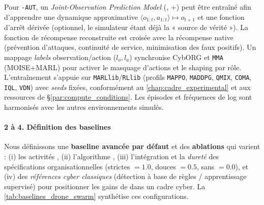 Pour \texttt{-AUT}, un \textit{Joint-Observation Prediction Model} (, +) peut être entraîné afin d’apprendre une dynamique approximative $\langle o_{1:t}, a_{1:t} \rangle \mapsto o_{t+1}$ et une fonction d’arrêt dérivée (optionnel, le simulateur étant déjà la « source de vérité »). La fonction de récompense reconstruite est croisée avec la récompense native (prévention d’attaques, continuité de service, minimisation des faux positifs). Un mappage \emph{labels} observation/action ($l_o, l_a$) synchronise CybORG et \texttt{MMA} (MOISE+MARL) pour activer le masquage d’actions et le shaping par rôle. L’entraînement s’appuie sur \texttt{MARLlib}/\texttt{RLlib} (profils \texttt{MAPPO}, \texttt{MADDPG}, \texttt{QMIX}, \texttt{COMA}, \texttt{IQL}, \texttt{VDN}) avec \textit{seeds} fixées, conformément au \autoref{chap:cadre_experimental} et aux ressources de \S\ref{par:compute_conditions}. Les épisodes et fréquences de log sont harmonisés avec les autres environnements simulés.

\paragraph{2 à 4. Définition des baselines}

Nous définissons une \textbf{baseline avancée par défaut} et des \textbf{ablations} qui varient : (i) les activités , (ii) l’algorithme , (iii) l’intégration et la \textit{dureté} des spécifications organisationnelles (strictes $=1.0$, douces $=0.5$, sans $=0.0$), et (iv) des \textit{références cyber classiques} (détection à base de règles / apprentissage supervisé) pour positionner les gains de  dans un cadre cyber. La \autoref{tab:baselines_drone_swarm} synthétise ces configurations.

